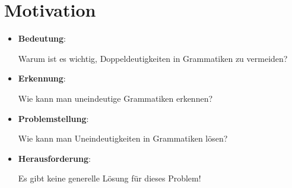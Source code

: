 \documentclass[t]{beamer}
\begin{document}
\section{Motivation}
\begin{frame}
\begin{center}
        \vspace{20pt}
        \begin{itemize}
        \item \textbf{Bedeutung}: \par
        Warum ist es wichtig, Doppeldeutigkeiten in Grammatiken zu vermeiden?\cite{watrous}  \par
        
        \vspace{10pt}

        \item \textbf{Erkennung}: \par
        Wie kann man uneindeutige Grammatiken erkennen?\cite{springer2013} 
        
        \vspace{10pt}
        
        \item \textbf{Problemstellung}: \par
        Wie kann man Uneindeutigkeiten in Grammatiken lösen?\cite{wharton1976} 
        
        \vspace{10pt}
        
        \item \textbf{Herausforderung}: \par
        Es gibt keine generelle Lösung für dieses Problem!\cite{thorup1994} 
    \end{itemize}
\end{center}
\end{frame}

\end{document}

